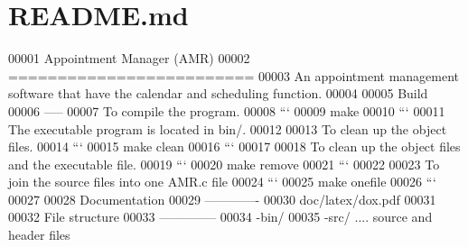 \section{R\+E\+A\+D\+M\+E.\+md}

\begin{DoxyCode}
00001 Appointment Manager (AMR)
00002 =========================
00003 An appointment management software that have the calendar and scheduling function.
00004 
00005 Build
00006 -----
00007 To compile the program.
00008 ```
00009 make
00010 ```
00011 The executable program is located in bin/.
00012 
00013 To clean up the object files.
00014 ```
00015 make clean
00016 ```
00017 
00018 To clean up the object files and the executable file.
00019 ```
00020 make remove
00021 ```
00022 
00023 To join the source files into one AMR.c file
00024 ```
00025 make onefile
00026 ```
00027 
00028 Documentation
00029 -------------
00030 doc/latex/dox.pdf
00031 
00032 File structure
00033 --------------
00034 -bin/
00035 -src/ .... source and header files
\end{DoxyCode}
